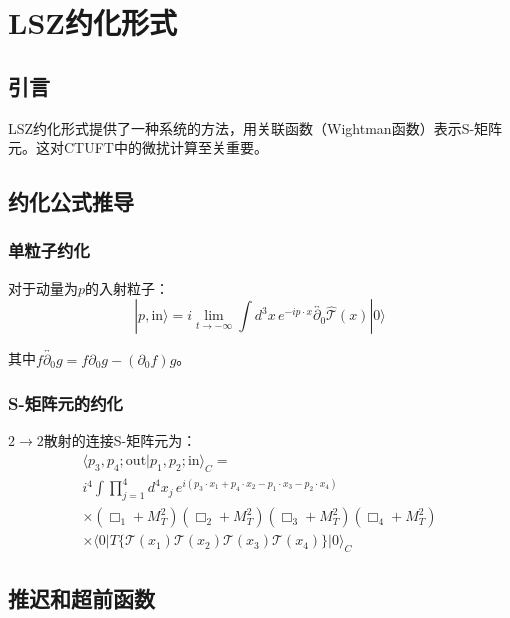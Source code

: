 \section{LSZ约化形式}
\label{sec:lsz}

\subsection{引言}

LSZ约化形式提供了一种系统的方法，用关联函数（Wightman函数）表示S-矩阵元。这对CTUFT中的微扰计算至关重要。

\subsection{约化公式推导}

\subsubsection{单粒子约化}

对于动量为$p$的入射粒子：
\begin{equation}
    |p, \text{in}\rangle = i \lim_{t \to -\infty} \int d^3x \, e^{-ip \cdot x} \overleftrightarrow{\partial_0} \hat{\mathcal{T}}(x) |0\rangle
\end{equation}

其中$f \overleftrightarrow{\partial_0} g = f \partial_0 g - (\partial_0 f) g$。

\subsubsection{S-矩阵元的约化}

\begin{theorem}[LSZ约化]
$2 \to 2$散射的连接S-矩阵元为：
\begin{multline}
    \langle p_3, p_4; \text{out} | p_1, p_2; \text{in} \rangle_C = \\
    i^4 \int \prod_{j=1}^4 d^4x_j \, e^{i(p_3 \cdot x_1 + p_4 \cdot x_2 - p_1 \cdot x_3 - p_2 \cdot x_4)} \\
    \times (\Box_1 + M_T^2)(\Box_2 + M_T^2)(\Box_3 + M_T^2)(\Box_4 + M_T^2) \\
    \times \langle 0 | T\{\mathcal{T}(x_1)\mathcal{T}(x_2)\mathcal{T}(x_3)\mathcal{T}(x_4)\} | 0 \rangle_C
\end{multline}
\end{theorem}

\subsection{推迟和超前函数}

